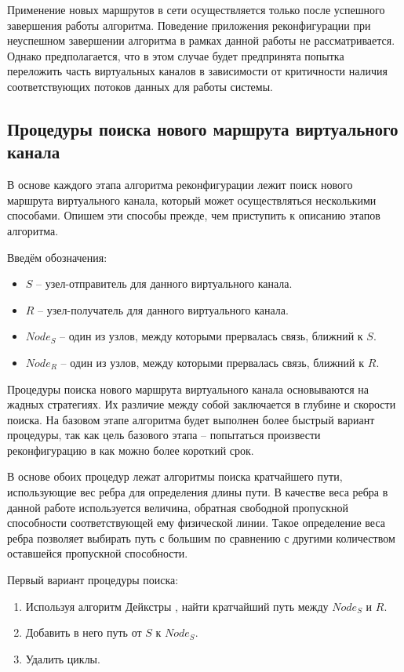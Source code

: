 \documentclass[12pt, a4paper]{article}
\begin{document}
Применение новых маршрутов в сети осуществляется только после успешного завершения работы алгоритма. Поведение приложения реконфигурации при неуспешном завершении алгоритма в рамках данной работы не рассматривается. Однако предполагается, что в этом случае будет предпринята попытка переложить часть виртуальных каналов в зависимости от критичности наличия соответствующих потоков данных для работы системы. 

\FloatBarrier

\subsection{Процедуры поиска нового маршрута виртуального канала} \label{subsec:procalg}
В основе каждого этапа алгоритма реконфигурации лежит поиск нового маршрута виртуального канала, который может осуществляться несколькими способами. Опишем эти способы прежде, чем приступить к описанию этапов алгоритма.

Введём обозначения:
\begin{itemize}
	\item $S$ -- узел-отправитель для данного виртуального канала.
	\item $R$ -- узел-получатель для данного виртуального канала.
	\item $Node_{S}$ – один из узлов, между которыми прервалась связь, ближний к $S$.
	\item $Node_{R}$ – один из узлов, между которыми прервалась связь, ближний к $R$.
\end{itemize}

Процедуры поиска нового маршрута виртуального канала основываются на жадных стратегиях. Их различие между собой заключается в глубине и скорости поиска. На базовом этапе алгоритма будет выполнен более быстрый вариант процедуры, так как цель базового этапа -- попытаться произвести реконфигурацию в как можно более короткий срок.

В основе обоих процедур лежат алгоритмы поиска кратчайшего пути, использующие вес ребра для определения длины пути. В качестве веса ребра в данной работе используется величина, обратная свободной пропускной способности соответствующей ему физической линии. Такое определение веса ребра позволяет выбирать путь с большим по сравнению с другими количеством оставшейся пропускной способности. 

Первый вариант процедуры поиска:
\begin{enumerate}
	\item Используя алгоритм Дейкстры \cite{dejkstra}, найти кратчайший путь между $Node_{S}$ и $R$.
	\item Добавить в него путь от $S$ к $Node_{S}$.
	\item Удалить циклы.
\end{enumerate}
\end{document}
